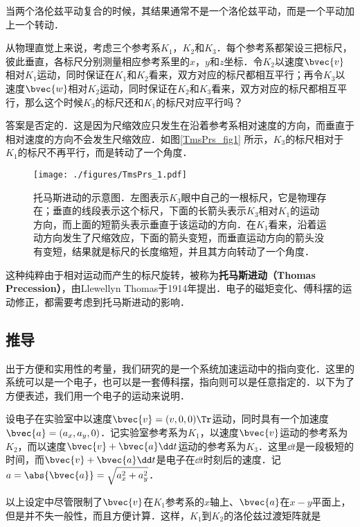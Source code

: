 

当两个洛伦兹平动复合的时候，其结果通常不是一个洛伦兹平动，而是一个平动加上一个转动．

从物理直觉上来说，考虑三个参考系$K_1$，$K_2$和$K_3$．每个参考系都架设三把标尺，彼此垂直，各标尺分别测量相应参考系里的$x$，$y$和$z$坐标．令$K_2$以速度$\bvec{v}$相对$K_1$运动，同时保证在$K_1$和$K_2$看来，双方对应的标尺都相互平行；再令$K_3$以速度$\bvec{w}$相对$K_2$运动，同时保证在$K_2$和$K_3$看来，双方对应的标尺都相互平行，那么这个时候$K_3$的标尺还和$K_1$的标尺对应平行吗？

答案是否定的．这是因为尺缩效应只发生在沿着参考系相对速度的方向，而垂直于相对速度的方向不会发生尺缩效应．如图\autoref{TmsPrs_fig1} 所示，$K_3$的标尺相对于$K_1$的标尺不再平行，而是转动了一个角度．

\begin{figure}[ht]
\centering
\texttt{[image: ./figures/TmsPrs\_1.pdf]}
\caption{托马斯进动的示意图．左图表示$K_3$眼中自己的一根标尺，它是物理存在；垂直的线段表示这个标尺，下面的长箭头表示$K_3$相对$K_1$的运动方向，而上面的短箭头表示垂直于该运动的方向．在$K_1$看来，沿着运动方向发生了尺缩效应，下面的箭头变短，而垂直运动方向的箭头没有变短，结果就是标尺的长度缩短，并且其方向转动了一个角度．} \label{TmsPrs_fig1}
\end{figure}

这种纯粹由于相对运动而产生的标尺旋转，被称为\textbf{托马斯进动（Thomas Precession）}，由Llewellyn Thomas于1914年提出．电子的磁矩变化、傅科摆的运动修正，都需要考虑到托马斯进动的影响．

\subsection{推导}

出于方便和实用性的考量，我们研究的是一个系统加速运动中的指向变化．这里的系统可以是一个电子，也可以是一套傅科摆，指向则可以是任意指定的．以下为了方便表述，我们用一个电子的运动来说明．

设电子在实验室中以速度$\bvec{v}=(v, 0, 0)\Tr$运动，同时具有一个加速度$\bvec{a}=(a_x, a_y, 0)$．记实验室参考系为$K_1$，以速度$\bvec{v}$运动的参考系为$K_2$，而以速度$\bvec{v}+\bvec{a}\dd t$运动的参考系为$K_3$．这里$\dd t$是一段极短的时间，而$\bvec{v}+\bvec{a}\dd t$是电子在$\dd t$时刻后的速度．记$a=\abs{\bvec{a}}=\sqrt{a_x^2+a_y^2}$．

以上设定中尽管限制了$\bvec{v}$在$K_1$参考系的$x$轴上、$\bvec{a}$在$x-y$平面上，但是并不失一般性，而且方便计算．这样，$K_1$到$K_2$的洛伦兹过渡矩阵就是

